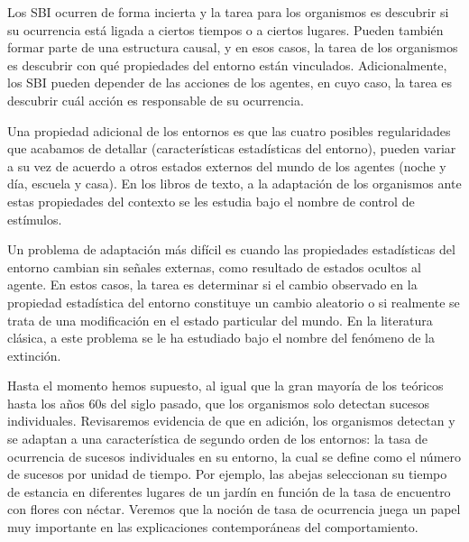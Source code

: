\documentclass[
  letterpaper,
]{book}
\begin{document}
Los SBI ocurren de forma incierta y la tarea para los organismos es
descubrir si su ocurrencia está ligada a ciertos tiempos o a ciertos
lugares. Pueden también formar parte de una estructura causal, y en esos
casos, la tarea de los organismos es descubrir con qué propiedades del
entorno están vinculados. Adicionalmente, los SBI pueden depender de las
acciones de los agentes, en cuyo caso, la tarea es descubrir cuál acción
es responsable de su ocurrencia.

Una propiedad adicional de los entornos es que las cuatro posibles
regularidades que acabamos de detallar (características estadísticas del
entorno), pueden variar a su vez de acuerdo a otros estados externos del
mundo de los agentes (noche y día, escuela y casa). En los libros de
texto, a la adaptación de los organismos ante estas propiedades del
contexto se les estudia bajo el nombre de control de estímulos.

Un problema de adaptación más difícil es cuando las propiedades
estadísticas del entorno cambian sin señales externas, como resultado de
estados ocultos al agente. En estos casos, la tarea es determinar si el
cambio observado en la propiedad estadística del entorno constituye un
cambio aleatorio o si realmente se trata de una modificación en el
estado particular del mundo. En la literatura clásica, a este problema
se le ha estudiado bajo el nombre del fenómeno de la extinción.

Hasta el momento hemos supuesto, al igual que la gran mayoría de los
teóricos hasta los años 60s del siglo pasado, que los organismos solo
detectan sucesos individuales. Revisaremos evidencia de que en adición,
los organismos detectan y se adaptan a una característica de segundo
orden de los entornos: la tasa de ocurrencia de sucesos individuales en
su entorno, la cual se define como el número de sucesos por unidad de
tiempo. Por ejemplo, las abejas seleccionan su tiempo de estancia en
diferentes lugares de un jardín en función de la tasa de encuentro con
flores con néctar. Veremos que la noción de tasa de ocurrencia juega un
papel muy importante en las explicaciones contemporáneas del
comportamiento.
\end{document}
